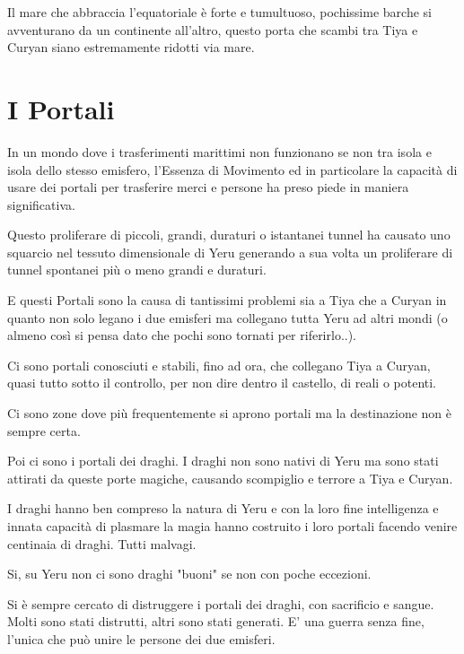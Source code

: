 \documentclass[a4paper,11pt,twoside,openany]{book}
\begin{document}
Il mare che abbraccia l'equatoriale è forte e tumultuoso, pochissime barche si avventurano da un continente all'altro, questo porta che scambi tra Tiya e Curyan siano estremamente ridotti via mare.


\pagebreak

\section{I Portali}

\label{i-portali}

In un mondo dove i trasferimenti marittimi non funzionano se non tra isola e isola dello stesso emisfero, l'Essenza di Movimento ed in particolare la capacità di usare dei portali per trasferire merci e persone ha preso piede in maniera significativa.

Questo proliferare di piccoli, grandi, duraturi o istantanei tunnel ha causato uno squarcio nel tessuto dimensionale di Yeru generando a sua volta un proliferare di tunnel spontanei più o meno grandi e duraturi.

E questi Portali sono la causa di tantissimi problemi sia a Tiya che a Curyan in quanto non solo legano i due emisferi ma collegano tutta Yeru ad altri mondi (o almeno così si pensa dato che pochi sono tornati per riferirlo..).

Ci sono portali conosciuti e stabili, fino ad ora, che collegano Tiya a Curyan, quasi tutto sotto il controllo, per non dire dentro il castello, di reali o potenti.

Ci sono zone dove più frequentemente si aprono portali ma la destinazione non è sempre certa.

Poi ci sono i portali dei draghi. I draghi non sono nativi di Yeru ma sono stati attirati da queste porte magiche, causando scompiglio e terrore a Tiya e Curyan.

I draghi hanno ben compreso la natura di Yeru e con la loro fine intelligenza e innata capacità di plasmare la magia hanno costruito i loro portali facendo venire centinaia di draghi. Tutti malvagi.

Si, su Yeru non ci sono draghi "buoni" se non con poche eccezioni.

Si è sempre cercato di distruggere i portali dei draghi, con sacrificio e sangue. Molti sono stati distrutti, altri sono stati generati. E' una guerra senza fine, l'unica che può unire le persone dei due emisferi.

\pagebreak
\end{document}
